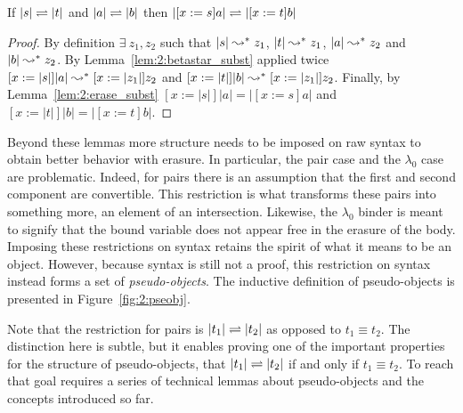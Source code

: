 \begin{lemma}
    If $|s| \rightleftharpoons |t|$ and $|a| \rightleftharpoons |b|$ then $|[x := s]a| \rightleftharpoons |[x := t]b|$
    \label{lem:2:betaconv_erased_subst}
\end{lemma}
\begin{proof}
    By definition $\exists\ z_1, z_2$ such that $|s| \leadsto^* z_1$, $|t| \leadsto^* z_1$, $|a| \leadsto^* z_2$ and $|b| \leadsto^* z_2$.
    By Lemma~\ref{lem:2:betastar_subst} applied twice $[x := |s|]|a| \leadsto^* [x := |z_1|]z_2$ and $[x := |t|]|b| \leadsto^* [x := |z_1|]z_2$.
    Finally, by Lemma~\ref{lem:2:erase_subst} $[x := |s|]|a| = |[x := s]a|$ and $[x := |t|]|b| = |[x := t]b|$.
\end{proof}

Beyond these lemmas more structure needs to be imposed on raw syntax to obtain better behavior with erasure.
In particular, the pair case and the $\lambda_0$ case are problematic.
Indeed, for pairs there is an assumption that the first and second component are convertible.
This restriction is what transforms these pairs into something more, an element of an intersection.
Likewise, the $\lambda_0$ binder is meant to signify that the bound variable does not appear free in the erasure of the body.
Imposing these restrictions on syntax retains the spirit of what it means to be an object.
However, because syntax is still not a proof, this restriction on syntax instead forms a set of \textit{pseudo-objects}.
The inductive definition of pseudo-objects is presented in Figure~\ref{fig:2:pseobj}.



Note that the restriction for pairs is $|t_1| \rightleftharpoons |t_2|$ as opposed to $t_1 \equiv t_2$.
The distinction here is subtle, but it enables proving one of the important properties for the structure of pseudo-objects, that $|t_1| \rightleftharpoons |t_2|$ if and only if $t_1 \equiv t_2$.
To reach that goal requires a series of technical lemmas about pseudo-objects and the concepts introduced so far.

